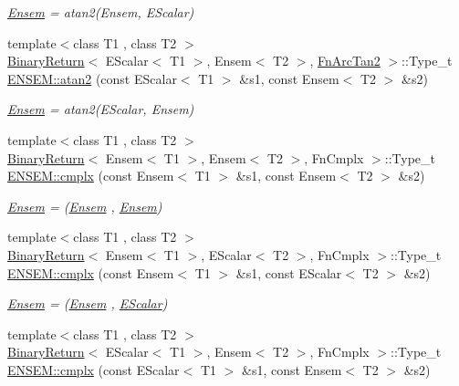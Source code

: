 \begin{DoxyCompactItemize}
\begin{DoxyCompactList}\small\item\em \mbox{\hyperlink{classENSEM_1_1Ensem}{Ensem}} = atan2(\+Ensem, E\+Scalar) \end{DoxyCompactList}\item 
{\footnotesize template$<$class T1 , class T2 $>$ }\\\mbox{\hyperlink{structBinaryReturn}{Binary\+Return}}$<$ E\+Scalar$<$ T1 $>$, Ensem$<$ T2 $>$, \mbox{\hyperlink{structFnArcTan2}{Fn\+Arc\+Tan2}} $>$\+::Type\+\_\+t \mbox{\hyperlink{group__eensem_ga04b957edb43f4b1eee36cecfac095807}{E\+N\+S\+E\+M\+::atan2}} (const E\+Scalar$<$ T1 $>$ \&s1, const Ensem$<$ T2 $>$ \&s2)
\begin{DoxyCompactList}\small\item\em \mbox{\hyperlink{classENSEM_1_1Ensem}{Ensem}} = atan2(\+E\+Scalar, Ensem) \end{DoxyCompactList}\item 
{\footnotesize template$<$class T1 , class T2 $>$ }\\\mbox{\hyperlink{structBinaryReturn}{Binary\+Return}}$<$ Ensem$<$ T1 $>$, Ensem$<$ T2 $>$, Fn\+Cmplx $>$\+::Type\+\_\+t \mbox{\hyperlink{group__eensem_gaed2aa58870f554b9ad30212f8d25ca46}{E\+N\+S\+E\+M\+::cmplx}} (const Ensem$<$ T1 $>$ \&s1, const Ensem$<$ T2 $>$ \&s2)
\begin{DoxyCompactList}\small\item\em \mbox{\hyperlink{classENSEM_1_1Ensem}{Ensem}} = (\mbox{\hyperlink{classENSEM_1_1Ensem}{Ensem}} , \mbox{\hyperlink{classENSEM_1_1Ensem}{Ensem}}) \end{DoxyCompactList}\item 
{\footnotesize template$<$class T1 , class T2 $>$ }\\\mbox{\hyperlink{structBinaryReturn}{Binary\+Return}}$<$ Ensem$<$ T1 $>$, E\+Scalar$<$ T2 $>$, Fn\+Cmplx $>$\+::Type\+\_\+t \mbox{\hyperlink{group__eensem_gadd471503e7ac8d60fb8a955e1999f6fa}{E\+N\+S\+E\+M\+::cmplx}} (const Ensem$<$ T1 $>$ \&s1, const E\+Scalar$<$ T2 $>$ \&s2)
\begin{DoxyCompactList}\small\item\em \mbox{\hyperlink{classENSEM_1_1Ensem}{Ensem}} = (\mbox{\hyperlink{classENSEM_1_1Ensem}{Ensem}} , \mbox{\hyperlink{classENSEM_1_1EScalar}{E\+Scalar}}) \end{DoxyCompactList}\item 
{\footnotesize template$<$class T1 , class T2 $>$ }\\\mbox{\hyperlink{structBinaryReturn}{Binary\+Return}}$<$ E\+Scalar$<$ T1 $>$, Ensem$<$ T2 $>$, Fn\+Cmplx $>$\+::Type\+\_\+t \mbox{\hyperlink{group__eensem_gae141b1babc25cfea8bcda2218aea5125}{E\+N\+S\+E\+M\+::cmplx}} (const E\+Scalar$<$ T1 $>$ \&s1, const Ensem$<$ T2 $>$ \&s2)

\end{DoxyCompactItemize}
